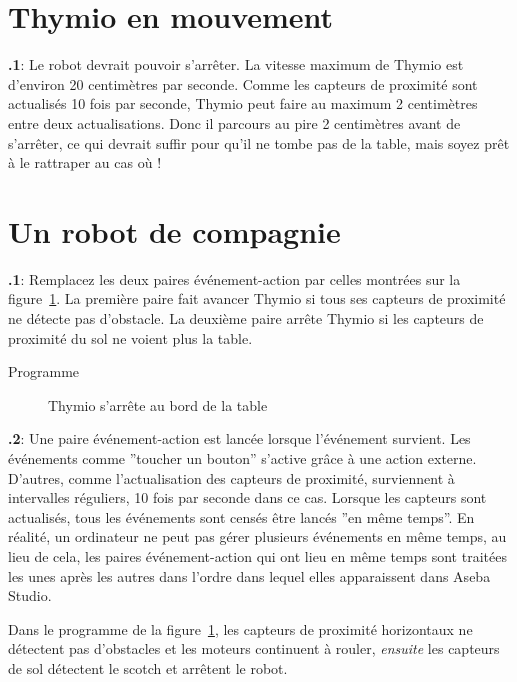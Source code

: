 \documentclass[12pt,a4paper,english]{article}
\begin{document}
\section{Thymio en mouvement}

\textbf{\thesection.1}: Le robot devrait pouvoir s'arrêter. La vitesse maximum de Thymio est d'environ 20 centimètres par seconde. Comme les capteurs de proximité sont actualisés 10 fois par seconde, Thymio peut faire au maximum 2 centimètres entre deux actualisations. Donc il parcours au pire 2 centimètres avant de s'arrêter, ce qui devrait suffir pour qu'il ne tombe pas de la table, mais soyez prêt à le rattraper au cas où !


\section{Un robot de compagnie}

\textbf{\thesection.1}: Remplacez les deux paires événement-action par celles montrées sur la figure~\ref{fig.answer1}. La première paire fait avancer Thymio si tous ses capteurs de proximité ne détecte pas d'obstacle. La deuxième paire arrête Thymio si les capteurs de proximité du sol ne voient plus la table.

{\raggedleft \hfill Programme }

\begin{figure}[hbt]
\begin{center}
\caption{Thymio s'arrête au bord de la table}\label{fig.answer1}
\end{center}
\end{figure}

\textbf{\thesection.2}: Une paire événement-action est lancée lorsque l'événement survient. Les événements comme ''toucher un bouton'' s'active grâce à une action externe. D'autres, comme l'actualisation des capteurs de proximité, surviennent à intervalles réguliers, 10 fois par seconde dans ce cas. Lorsque les capteurs sont actualisés, tous les événements sont censés être lancés ''en même temps''. En réalité, un ordinateur ne peut pas gérer plusieurs événements en même temps, au lieu de cela, les paires événement-action qui ont lieu en même temps sont traitées les unes après les autres dans l'ordre dans lequel elles apparaissent dans Aseba Studio.

Dans le programme de la figure~\ref{fig.answer1}, les capteurs de proximité horizontaux ne détectent pas d'obstacles et les moteurs continuent à rouler, \emph{ensuite} les capteurs de sol détectent le scotch et arrêtent le robot.
\end{document}
